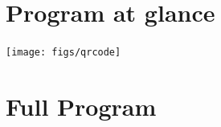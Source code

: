\documentclass[11pt,twoside,b5paper]{book}
\begin{document}
\chapter{Program at glance}
\noindent{}
\begin{flushright}
\texttt{[image: figs/qrcode]}
\end{flushright}

\chapter{Full Program}

\end{document}
